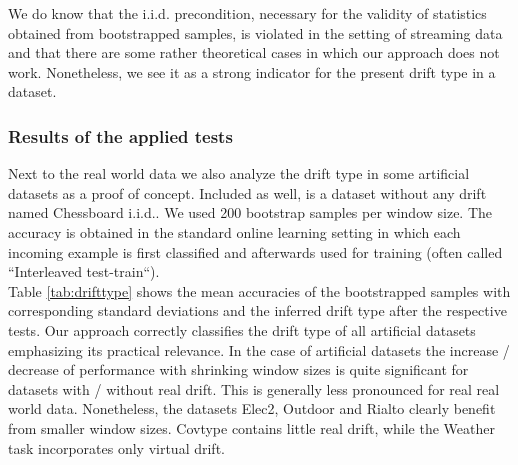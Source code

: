 \documentclass[conference]{IEEEtran}
\begin{document}
We do know that the i.i.d. precondition, necessary for the validity of statistics obtained from bootstrapped samples, is violated in the setting of streaming data
and that there are some rather theoretical cases in which our approach does not work. Nonetheless, we see it as a strong indicator for the present drift type in a dataset.\\

\subsubsection{Results of the applied tests}
Next to the real world data we also analyze the drift type in some artificial datasets as a proof of concept. Included as well, is a dataset without any drift named Chessboard i.i.d..
We used 200 bootstrap samples per window size. The accuracy is obtained in the standard online learning setting in which each incoming example is first classified and 
afterwards used for training (often called ``Interleaved test-train``).\\
Table \ref{tab:drifttype} shows the mean accuracies of the bootstrapped samples with corresponding standard deviations and the inferred drift type after the respective tests. 
Our approach correctly classifies the drift type of all artificial datasets emphasizing its practical relevance. 
In the case of artificial datasets the increase / decrease of performance with shrinking window sizes is quite significant for datasets
with / without real drift. This is generally less pronounced for real real world data. Nonetheless, the datasets Elec2, Outdoor and Rialto clearly benefit from smaller window sizes. 
Covtype contains little real drift, while the Weather task incorporates only virtual drift.
\end{document}
